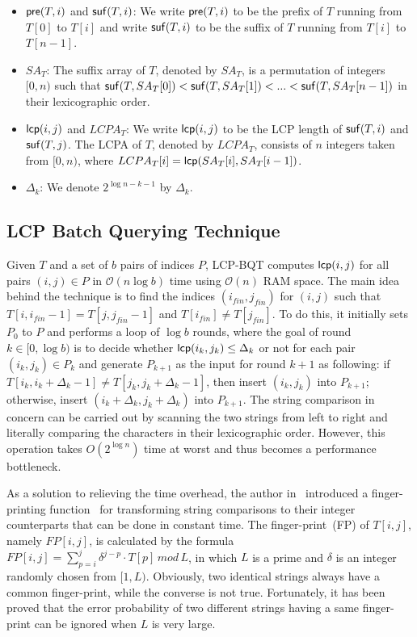 \documentclass{llncs}
\begin{document}
\begin{itemize}
\item ${\sf pre}(T,i)$ and ${\sf suf}(T,i)$: We write ${\sf pre}(T,i)$ to be the prefix of $T$ running from $T[0]$ to $T[i]$ and write ${\sf suf}(T,i)$ to be the suffix of $T$ running from $T[i]$ to $T[n-1]$.
\item  $SA_T$:  The suffix array of $T$, denoted by $SA_T$, is a permutation of integers $[0,n)$ such that ${\sf suf}(T,SA_T[0])<{\sf suf}(T,SA_T[1])<...<{\sf suf}(T,SA_T[n-1])$ in their lexicographic order.
\item ${\sf lcp}(i,j)$ and $LCPA_T$: We write ${\sf lcp}(i,j)$ to be the LCP length of ${\sf suf}(T,i)$ and ${\sf suf}(T,j)$. The LCPA of $T$, denoted by $LCPA_T$, consists of $n$ integers taken from $[0,n)$, where $LCPA_T[i]= {\sf lcp}(SA_T[i],SA_T[i-1])$.
\item $\Delta_{k}$: We denote $2^{\log n - k - 1}$ by $\Delta_{k}$.
\end{itemize}

\subsection{LCP Batch Querying Technique}\label{subsec:lcp_batch_querying_technique}

Given $T$ and a set of $b$ pairs of indices $P$, LCP-BQT computes ${\sf lcp}(i,j)$ for all pairs $(i,j)\in P$ in $\mathcal{O}(n\log b)$ time using $\mathcal{O}(n)$ RAM space. The main idea behind the technique is to find the indices $(i_{fin}, j_{fin})$ for $(i,j)$ such that $T[i,i_{fin}-1]=T[j,j_{fin}-1]$ and $T[i_{fin}] \neq T[j_{fin}]$. To do this, it initially sets $P_0$ to $P$ and performs a loop of $\log b$ rounds, where the goal of round $k\in [0,\log b)$ is to decide whether ${\sf lcp}(i_k,j_k) \le \Delta_k$ or not for each pair $(i_k,j_k)\in P_k$ and generate $P_{k+1}$ as the input for round $k+1$ as following: if $T[i_k,i_k+\Delta_k-1] \neq T[j_k,j_k+\Delta_k-1]$, then insert $(i_k,j_k)$ into $P_{k+1}$; otherwise, insert $(i_k+\Delta_k,j_k+\Delta_k)$ into $P_{k+1}$. The string comparison in concern can be carried out by scanning the two strings from left to right and literally comparing the characters in their lexicographic order. However, this operation takes $O(2^{\log n})$ time at worst and thus becomes a performance bottleneck.

As a solution to relieving the time overhead, the author in~\cite{Philip2013} introduced a finger-printing function~\cite{Karp1987} for transforming string comparisons to their integer counterparts that can be done in constant time. The finger-print~(FP) of $T[i,j]$, namely $FP[i,j]$, is calculated by the formula $FP[i,j] = \sum_{p=i}^{j} \delta^{j-p} \cdot T[p] \, mod \, L$, in which $L$ is a prime and $\delta$ is an integer randomly chosen from $[1,L)$. Obviously, two identical strings always have a common finger-print, while the converse is not true. Fortunately, it has been proved that the error probability of two different strings having a same finger-print can be ignored when $L$ is very large.
\end{document}
